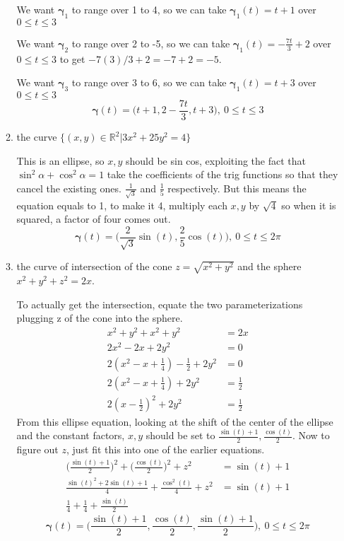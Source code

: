 \documentclass{article}
\begin{document}
\begin{enumerate}
\begin{enumerate}
        We want $\boldsymbol{\gamma}_1$ to range over 1 to 4, so we can take $\boldsymbol{\gamma}_1(t)= t+1$ over $0\leq t \leq 3$

        We want $\boldsymbol{\gamma}_2$ to range over 2 to -5, so we can take $\boldsymbol{\gamma}_1(t)= -\frac{7t}{3}+2$ over $0\leq t \leq 3$ to get $-7(3)/3 + 2 = -7 + 2 = -5$.

        We want $\boldsymbol{\gamma}_3$ to range over 3 to 6, so we can take $\boldsymbol{\gamma}_1(t)= t+3$ over $0\leq t \leq 3$
        \[ \boldsymbol{\gamma}(t) = \Big(t+1,2-\frac{7t}{3}, t+3 \Big),\: 0 \leq t \leq 3 \]
    \item the curve $\{(x,y)\in \mathbb{R}^2|3x^2+25y^2=4\}$
    
    This is an ellipse, so $x,y$ should be sin cos, exploiting the fact that $\sin^2 \alpha + \cos^2 \alpha = 1$ take the coefficients of the trig functions so that they cancel the existing ones. $\frac{1}{\sqrt{3}}$ and $\frac{1}{5}$ respectively. But this means the equation equals to 1, to make it 4, multiply each $x,y$ by $\sqrt{4}$ so when it is squared, a factor of four comes out.
        \[ \boldsymbol{\gamma}(t) = \Big(\frac{2}{\sqrt{3}} \sin(t), \frac{2}{5}\cos(t)\Big), \: 0 \leq t \leq 2\pi \]
    \item the curve of intersection of the cone $z=\sqrt{x^2 + y^2}$ and the sphere $x^2+y^2+z^2 = 2x$.
        
        To actually get the intersection, equate the two parameterizations plugging z of the cone into the sphere.
        \begin{align*}
            x^2 + y^2 + x^2 + y^2 &= 2x \\
            2x^2 - 2x +2y^2 &= 0 \\
            2(x^2 - x + \frac{1}{4}) - \frac{1}{2} +2y^2 &= 0 \\
            2(x^2 - x + \frac{1}{4}) +2y^2 &= \frac{1}{2} \\
            2(x - \frac{1}{2})^2 +2y^2 &= \frac{1}{2}
        \end{align*}
        From this ellipse equation, looking at the shift of the center of the ellipse and the constant factors, $x,y$ should be set to $\frac{\sin(t) + 1}{2}, \frac{\cos(t)}{2}$. Now to figure out $z$, just fit this into one of the earlier equations.
        \begin{align*}
            \Big( \frac{\sin(t) + 1}{2} \Big)^2 + \Big( \frac{\cos(t)}{2} \Big)^2 + z^2 &= \sin(t) + 1 \\
            \frac{\sin(t)^2 + 2\sin(t) + 1}{4} + \frac{\cos^2(t)}{4} + z^2 &= \sin(t) + 1 \\
            \frac{1}{4} + \frac{1}{4} + \frac{\sin(t)}{2}
        \end{align*}
        \[ \boldsymbol{\gamma}(t) = \Big( \frac{\sin(t) + 1}{2}, \frac{\cos(t)}{2}, \frac{\sin(t) + 1}{2} \Big), \: 0 \leq t \leq 2\pi \]
\end{enumerate}


\end{enumerate}
\end{document}
